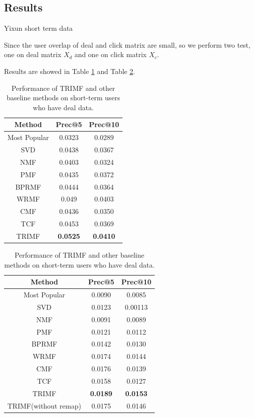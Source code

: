 \subsection{Results}
  \begin{subsubsection}{Yixun short term data}
\par{Since the user overlap of deal and click matrix are small, so we perform two test, one on deal matrix $X_d$ and one on click matrix $X_c$.}
\par{Results are showed in Table \ref{shortdeal} and Table \ref{shortclick}.}
\begin{table}


\begin{center}
  \begin{tabular}{|c|c|c|}
    \hline
    Method&Prec@5&Prec@10\\
    \hline
    Most Popular&0.0323&0.0289\\
    \hline
    SVD&0.0438&0.0367\\
    \hline
    NMF&0.0403&0.0324\\
    \hline
    PMF&0.0435&0.0372\\
    \hline
    BPRMF&0.0444&0.0364\\
    \hline
    WRMF&0.049&0.0403\\
    \hline
    CMF&0.0436&0.0350\\
    \hline
    TCF&0.0453&0.0369\\
    \hline
    TRIMF&\textbf{\color{red}0.0525}&\textbf{\color{red}0.0410}\\
    \hline
  \end{tabular}
\end{center}
\caption{Performance of TRIMF and other baseline methods on short-term users who have deal data.}
\label{shortdeal}

\end{table}

\begin{table}

  \centering


  \begin{tabular}{|c|c|c|}
    \hline
    Method&Prec@5&Prec@10\\
    \hline
    Most Popular&0.0090&0.0085\\
    \hline
    SVD&0.0123&0.00113\\
    \hline
    NMF&0.0091&0.0089\\
    \hline
    PMF&0.0121&0.0112\\
    \hline
    BPRMF&0.0142&0.0130\\
    \hline
    WRMF&0.0174&0.0144\\
    \hline
    CMF&0.0176&0.0139\\
    \hline
    TCF&0.0158&0.0127\\
    \hline
    TRIMF&\textbf{\color{red}0.0189}&\textbf{\color{red}0.0153}\\
    \hline
    TRIMF(without remap)&0.0175&0.0146\\
    \hline
  \end{tabular}
\caption{Performance of TRIMF and other baseline methods on short-term users who have deal data.}
  \label{shortclick}
  

\end{table}
\end{subsubsection}
